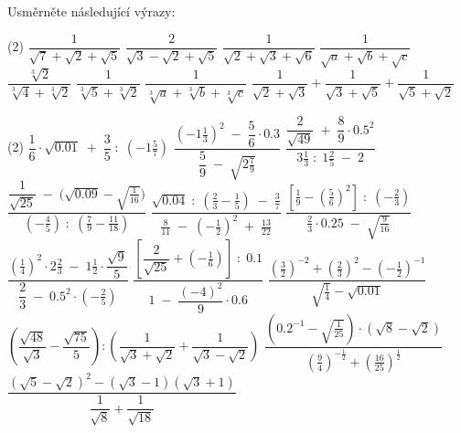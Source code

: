 \documentclass[12pt,a4paper]{article}
\begin{document}
\begin{exercise}
    Usměrněte následující výrazy:
    \begin{tasks}(2)
        \task $\dfrac{1}{\sqrt{7}+\sqrt{2}+\sqrt{5}}$
        \task $\dfrac{2}{\sqrt{3}-\sqrt{2}+\sqrt{5}}$
        \task $\dfrac{1}{\sqrt{2}+\sqrt{3}+\sqrt{6}}$
        \task $\dfrac{1}{\sqrt{a}+\sqrt{b}+\sqrt{c}}$
        \task $\dfrac{\sqrt[3]{2}}{\sqrt[3]{4}+\sqrt[3]{2}}$
        \task $\dfrac{1}{\sqrt[3]{5}+\sqrt[3]{2}}$
        \task $\dfrac{1}{\sqrt[3]{a}+\sqrt[3]{b}+\sqrt[3]{c}}$
        \task $\dfrac{1}{\sqrt{2}+\sqrt{3}}+\dfrac{1}{\sqrt{3}+\sqrt{5}}+\dfrac{1}{\sqrt{5}+\sqrt{2}}$
    \end{tasks}
\end{exercise}


\setcounter{section}{9}
\begin{exercise}
    \begin{tasks}(2)
        \task $\dfrac{1}{6}\cdot\sqrt{0.01}\;+\;\dfrac{3}{5}\;:\;\!\left(-1\tfrac{5}{7}\right)$
        \task $\dfrac{\left(-1\tfrac{1}{3}\right)^{2}\;-\;\dfrac{5}{6}\cdot 0.3}{\dfrac{5}{9}\;-\;\sqrt{2\tfrac{7}{9}}}$
        \task $\dfrac{\dfrac{2}{\sqrt{49}}\;+\;\dfrac{8}{9}\cdot 0.5^{2}}{3\tfrac{1}{3}\;:\;1\tfrac{2}{5}\;-\;2}$
        \task $\dfrac{\dfrac{1}{\sqrt{25}}\;-\;\big(\sqrt{0.09}-\sqrt{\tfrac{1}{16}}\big)}{\left(-\tfrac{4}{5}\right)\;:\;\left(\tfrac{7}{9}-\tfrac{11}{18}\right)}$
        \task $\dfrac{\sqrt{0.04}\;:\;\left(\tfrac{2}{3}-\tfrac{1}{5}\right)\;-\;\tfrac{3}{7}}{\tfrac{8}{11}\;-\;\left(-\tfrac{1}{2}\right)^{2}\;+\;\tfrac{13}{22}}$
        \task $\dfrac{\left[\tfrac{1}{9}-\left(\tfrac{5}{6}\right)^{2}\right]\;:\;\left(-\tfrac{2}{3}\right)}{\tfrac{2}{3}\cdot 0.25\;-\;\sqrt{\tfrac{9}{16}}}$
        \task $\dfrac{\left(\tfrac{1}{4}\right)^{2}\cdot 2\tfrac{2}{3}\;-\;1\tfrac{1}{2}\cdot \dfrac{\sqrt{9}}{5}}{\dfrac{2}{3}\;-\;0.5^{2}\cdot\left(-\tfrac{2}{5}\right)}$
        \task $\dfrac{\left[\dfrac{2}{\sqrt{25}}+\left(-\tfrac{1}{6}\right)\right]\;:\;0.1}{1\;-\;\dfrac{(-4)^{2}}{9}\cdot 0.6}$
        \task $\dfrac{\left(\tfrac{3}{2}\right)^{-2}+\left(\tfrac{2}{3}\right)^{2}-\left(-\tfrac{1}{2}\right)^{-1}}{\sqrt{\tfrac{1}{4}}-\sqrt{0.01}}$
        \task $\left(\dfrac{\sqrt{48}}{\sqrt{3}}-\dfrac{\sqrt{75}}{5}\right):\left(\dfrac{1}{\sqrt{3}+\sqrt{2}}+\dfrac{1}{\sqrt{3}-\sqrt{2}}\right)$
        \task $\dfrac{\left(0.2^{-1}-\sqrt{\tfrac{1}{25}}\right)\cdot\left(\sqrt{8}-\sqrt{2}\right)}{\left(\tfrac{9}{4}\right)^{-\tfrac{1}{2}}+\left(\tfrac{16}{25}\right)^{\tfrac{1}{2}}}$
        \task $\dfrac{\left(\sqrt{5}-\sqrt{2}\right)^{2}-\left(\sqrt{3}-1\right)\left(\sqrt{3}+1\right)}{\dfrac{1}{\sqrt{8}}+\dfrac{1}{\sqrt{18}}}$
    \end{tasks}
\end{exercise}
\end{document}
